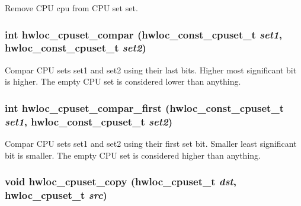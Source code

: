Remove CPU {\ttfamily cpu} from CPU set {\ttfamily set}. \hypertarget{group__hwlocality__cpuset_ga65b27f4710b7d2a2a6568cf3e2cb6d3b}{
\subsubsection[{hwloc\_\-cpuset\_\-compar}]{\setlength{\rightskip}{0pt plus 5cm}int hwloc\_\-cpuset\_\-compar ({\bf hwloc\_\-const\_\-cpuset\_\-t} {\em set1}, \/  {\bf hwloc\_\-const\_\-cpuset\_\-t} {\em set2})}}
\label{group__hwlocality__cpuset_ga65b27f4710b7d2a2a6568cf3e2cb6d3b}


Compar CPU sets {\ttfamily set1} and {\ttfamily set2} using their last bits. Higher most significant bit is higher. The empty CPU set is considered lower than anything. \hypertarget{group__hwlocality__cpuset_gae6281c5c6c916db85a9860ed570d6a56}{
\subsubsection[{hwloc\_\-cpuset\_\-compar\_\-first}]{\setlength{\rightskip}{0pt plus 5cm}int hwloc\_\-cpuset\_\-compar\_\-first ({\bf hwloc\_\-const\_\-cpuset\_\-t} {\em set1}, \/  {\bf hwloc\_\-const\_\-cpuset\_\-t} {\em set2})}}
\label{group__hwlocality__cpuset_gae6281c5c6c916db85a9860ed570d6a56}


Compar CPU sets {\ttfamily set1} and {\ttfamily set2} using their first set bit. Smaller least significant bit is smaller. The empty CPU set is considered higher than anything. \hypertarget{group__hwlocality__cpuset_gadad3d25553afca090a81ffa270208f2e}{
\subsubsection[{hwloc\_\-cpuset\_\-copy}]{\setlength{\rightskip}{0pt plus 5cm}void hwloc\_\-cpuset\_\-copy ({\bf hwloc\_\-cpuset\_\-t} {\em dst}, \/  {\bf hwloc\_\-cpuset\_\-t} {\em src})}}
\label{group__hwlocality__cpuset_gadad3d25553afca090a81ffa270208f2e}


